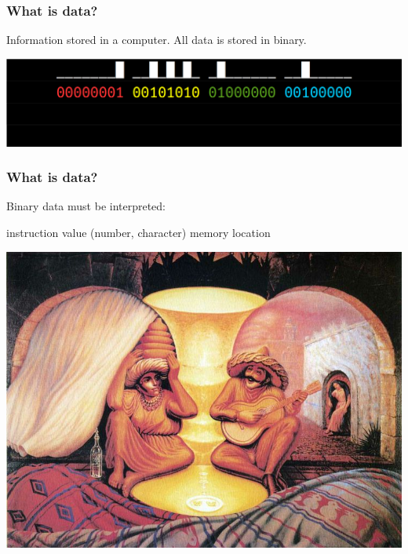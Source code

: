 \documentclass[11pt]{beamer}
\begin{document}
\begin{frame}
  \frametitle{What is data?}
  \Enlarge

  \begin{itemize} \pause
    \myitem Information stored in a computer. \pause
    \myitem All data is stored in binary.
  \end{itemize}
  \includegraphics[width=\textwidth]{./img/assembler-2.png}
\end{frame}

\begin{frame}
  \frametitle{What is data?}
  \Enlarge

  \begin{itemize}
    \myitem Binary data must be interpreted:
	\begin{itemize}
	  \mysubitem instruction \pause
	  \mysubitem value (number, character) \pause
	  \mysubitem memory location \pause
	\end{itemize}
  \end{itemize}
  \begin{centering}
  \includegraphics[height=0.5\textheight]{./img/dali.png}
  \end{centering}
\end{frame}
\end{document}
